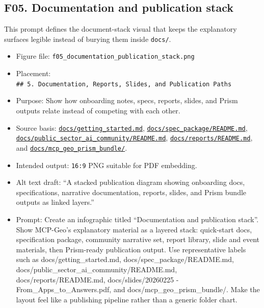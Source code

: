 \subsection{F05. Documentation and publication
stack}\label{f05.-documentation-and-publication-stack}

This prompt defines the document-stack visual that keeps the explanatory
surfaces legible instead of burying them inside \texttt{docs/}.

\begin{itemize}
\tightlist
\item
  Figure file: \texttt{f05\_documentation\_publication\_stack.png}
\item
  Placement:
  \texttt{\#\#\ 5.\ Documentation,\ Reports,\ Slides,\ and\ Publication\ Paths}
\item
  Purpose: Show how onboarding notes, specs, reports, slides, and Prism
  outputs relate instead of competing with each other.
\item
  Source basis:
  \href{https://github.com/chris-page-gov/mcp-geo/blob/fe862910da246ca77f374cfbe484985f5df4d316/docs/getting_started.md}{\texttt{docs/getting\_started.md}},
  \href{https://github.com/chris-page-gov/mcp-geo/blob/fe862910da246ca77f374cfbe484985f5df4d316/docs/spec_package/README.md}{\texttt{docs/spec\_package/README.md}},
  \href{https://github.com/chris-page-gov/mcp-geo/blob/fe862910da246ca77f374cfbe484985f5df4d316/docs/public_sector_ai_community/README.md}{\texttt{docs/public\_sector\_ai\_community/README.md}},
  \href{https://github.com/chris-page-gov/mcp-geo/blob/fe862910da246ca77f374cfbe484985f5df4d316/docs/reports/README.md}{\texttt{docs/reports/README.md}},
  and
  \href{https://github.com/chris-page-gov/mcp-geo/tree/fe862910da246ca77f374cfbe484985f5df4d316/docs/mcp_geo_prism_bundle}{\texttt{docs/mcp\_geo\_prism\_bundle/}}.
\item
  Intended output: \texttt{16:9} PNG suitable for PDF embedding.
\item
  Alt text draft: ``A stacked publication diagram showing onboarding
  docs, specifications, narrative documentation, reports, slides, and
  Prism bundle outputs as linked layers.''
\item
  Prompt: Create an infographic titled ``Documentation and publication
  stack''. Show MCP-Geo's explanatory material as a layered stack:
  quick-start docs, specification package, community narrative set,
  report library, slide and event materials, then Prism-ready
  publication output. Use representative labels such as
  docs/getting\_started.md, docs/spec\_package/README.md,
  docs/public\_sector\_ai\_community/README.md, docs/reports/README.md,
  docs/slides/20260225 - From\_Apps\_to\_Answers.pdf, and
  docs/mcp\_geo\_prism\_bundle/. Make the layout feel like a publishing
  pipeline rather than a generic folder chart.
\end{itemize}


